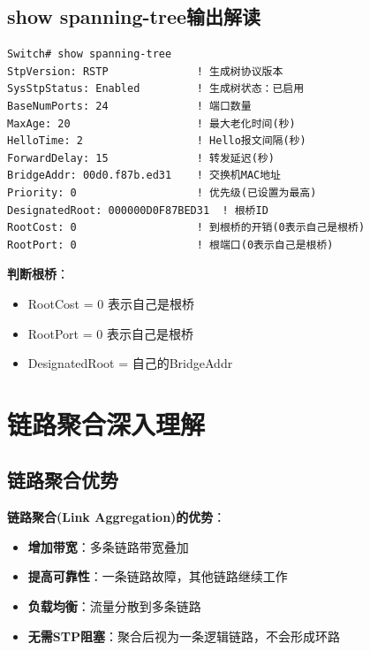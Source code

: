 \documentclass[12pt,a4paper]{ctexart}
\begin{document}
\subsection{show spanning-tree输出解读}

\begin{cmdbox}
\begin{lstlisting}
Switch# show spanning-tree
StpVersion: RSTP              ! 生成树协议版本
SysStpStatus: Enabled         ! 生成树状态：已启用
BaseNumPorts: 24              ! 端口数量
MaxAge: 20                    ! 最大老化时间(秒)
HelloTime: 2                  ! Hello报文间隔(秒)
ForwardDelay: 15              ! 转发延迟(秒)
BridgeAddr: 00d0.f87b.ed31    ! 交换机MAC地址
Priority: 0                   ! 优先级(已设置为最高)
DesignatedRoot: 000000D0F87BED31  ! 根桥ID
RootCost: 0                   ! 到根桥的开销(0表示自己是根桥)
RootPort: 0                   ! 根端口(0表示自己是根桥)
\end{lstlisting}

\textbf{判断根桥}：
\begin{itemize}[itemsep=0pt]
    \item RootCost = 0 表示自己是根桥
    \item RootPort = 0 表示自己是根桥
    \item DesignatedRoot = 自己的BridgeAddr
\end{itemize}
\end{cmdbox}

\section{链路聚合深入理解}

\subsection{链路聚合优势}

\begin{keybox}
\textbf{链路聚合(Link Aggregation)的优势}：
\begin{itemize}[itemsep=0pt]
    \item \textbf{增加带宽}：多条链路带宽叠加
    \item \textbf{提高可靠性}：一条链路故障，其他链路继续工作
    \item \textbf{负载均衡}：流量分散到多条链路
    \item \textbf{无需STP阻塞}：聚合后视为一条逻辑链路，不会形成环路
\end{itemize}
\end{keybox}
\end{document}
